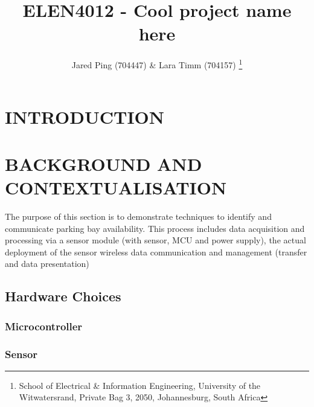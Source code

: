 \documentclass[10pt,twocolumn]{witseiepaper}
\begin{document}
	
	
\title{ELEN4012 - Cool project name here}
	
\author{Jared Ping (704447) \& Lara Timm (704157)
	\thanks{School of Electrical \& Information Engineering, University of the
			Witwatersrand, Private Bag 3, 2050, Johannesburg, South Africa}
}
	
	
\abstract{}
	
\keywords{}
	
	
\maketitle
	
\section{INTRODUCTION}

\section{BACKGROUND AND CONTEXTUALISATION}
The purpose of this section is to demonstrate techniques to identify and communicate parking bay availability. This process includes data acquisition and processing via a sensor module (with sensor, MCU and power supply), the actual deployment of the sensor  wireless data communication and management (transfer and data presentation) 
	\subsection{Hardware Choices}
		\subsubsection{Microcontroller}
		\subsubsection{Sensor}
\end{document}
